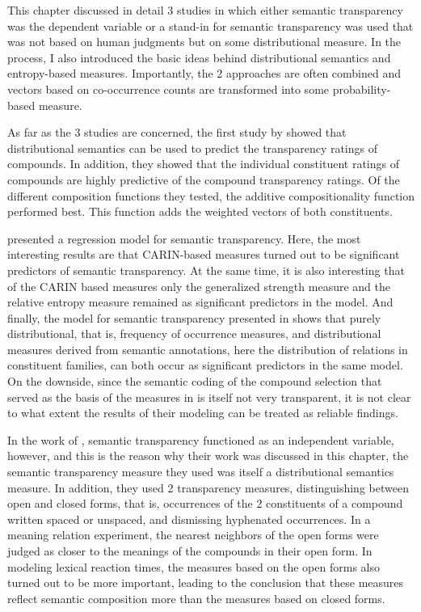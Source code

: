 This chapter discussed in detail 3 studies in which either semantic
transparency was the dependent variable or a stand-in for semantic transparency
was used that was not based on human judgments but on some
distributional measure. In the process, I also introduced the basic
ideas behind distributional semantics and entropy-based
measures. Importantly, the 2 approaches are often combined and
vectors based on co-occurrence counts are transformed into some
probability-based measure.

As far as the 3 studies are concerned, the first study by
\citeauthor{Reddyetal:2011} showed that distributional semantics can
be used to predict the transparency ratings of compounds. In addition,
they showed that the individual constituent ratings of compounds are
highly predictive of the compound transparency ratings. Of the
different composition functions they tested, the additive
compositionality function performed best. This function adds the
weighted vectors of both constituents.

\citeauthor{PhamandBaayen:2013} presented a regression
model for semantic transparency. Here, the most interesting results
are that CARIN-based measures turned out to be significant predictors
of semantic transparency. At the same time, it is also interesting that of the CARIN based measures only  the
generalized strength measure and the relative entropy measure remained
as significant predictors in the model. And finally, the model for
semantic transparency presented in \citeauthor{PhamandBaayen:2013}
shows that purely distributional, that is, frequency of occurrence measures, and distributional measures
derived from semantic annotations, here the distribution of relations
in constituent families, can both occur as significant predictors in
the same model. On the downside, since the semantic coding of the
compound selection that served as the basis of the measures in
\citet{PhamandBaayen:2013} is itself not very transparent, it is not
clear to what extent the results of their modeling can be treated as
reliable findings.

In the work of \citet{Marellietal:2014}, semantic transparency
functioned as an independent variable, however, and this is the reason why
their work was discussed in this chapter, the semantic transparency
measure they used was itself a distributional semantics measure. In
addition, they used 2 transparency measures, distinguishing between
open and closed forms, that is, occurrences of the 2 constituents of
a compound written spaced or unspaced, and dismissing hyphenated
occurrences. In a meaning relation experiment, the nearest neighbors
of the open forms were judged as closer to the meanings of the
compounds in their open form. In modeling lexical reaction times, the
measures based on the open forms also turned out to be more important,
leading \citet{Marellietal:2014} to the conclusion that these measures
reflect semantic composition more than the measures based on closed
forms.

